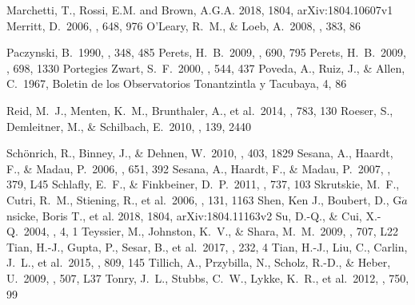 \documentclass[iop, aj]{emulateapj}
\begin{document}
\begin{thebibliography}{}
 Marchetti, T., Rossi, E.M. and Brown, A.G.A. 2018, 1804, arXiv:1804.10607v1
 Merritt, D.\ 2006, \apj, 648, 976
 O'Leary, R.~M., \& Loeb, A.\ 2008, \mnras, 383, 86

 Paczynski, B.\ 1990, \apj, 348, 485
 Perets, H.~B.\ 2009, \apj, 690, 795
 Perets, H.~B.\ 2009, \apj, 698, 1330
 Portegies Zwart, S.~F.\ 2000, \apj, 544, 437
 Poveda, A., Ruiz, J., \& Allen, C.\ 1967, Boletin de los Observatorios Tonantzintla y Tacubaya, 4, 86

 Reid, M.~J., Menten, K.~M., Brunthaler, A., et al.\ 2014, \apj, 783, 130
 Roeser, S., Demleitner, M., \& Schilbach, E.\ 2010, \aj, 139, 2440

 Sch{\"o}nrich, R., Binney, J., \& Dehnen, W.\ 2010, \mnras, 403, 1829
 Sesana, A., Haardt, F., \& Madau, P.\ 2006, \apj, 651, 392
 Sesana, A., Haardt, F., \& Madau, P.\ 2007, \mnras, 379, L45
 Schlafly, E.~F., \& Finkbeiner, D.~P.\ 2011, \apj, 737, 103
 Skrutskie, M.~F., Cutri, R.~M., Stiening, R., et al.\ 2006, \aj, 131, 1163
 Shen, Ken J., Boubert, D., G$\ddot{a}$nsicke, Boris T., et al. 2018, 1804, arXiv:1804.11163v2
 Su, D.-Q., \& Cui, X.-Q.\ 2004, \cjaa, 4, 1
 Teyssier, M., Johnston, K.~V., \& Shara, M.~M.\ 2009, \apjl, 707, L22
 Tian, H.-J., Gupta, P., Sesar, B., et al.\ 2017, \apjs, 232, 4
 Tian, H.-J., Liu, C., Carlin, J.~L., et al.\ 2015, \apj, 809, 145
 Tillich, A., Przybilla, N., Scholz, R.-D., \& Heber, U.\ 2009, \aap, 507, L37
 Tonry, J.~L., Stubbs, C.~W., Lykke, K.~R., et al.\ 2012, \apj, 750, 99


\end{thebibliography}
\end{document}
